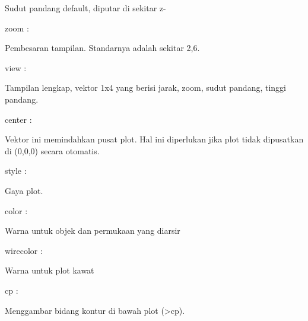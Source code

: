 \documentclass[a4paper,10pt]{article}
\begin{document}
\begin{eulernotebook}
\begin{eulercomment}
\begin{eulercomment}
\begin{eulercomment}
\begin{eulercomment}
\begin{eulercomment}
\begin{eulercomment}
\begin{eulercomment}
\begin{eulercomment}
\begin{eulerttcomment}
  Sudut pandang default, diputar di sekitar z-
\end{eulerttcomment}
\begin{eulercomment}
zoom :\\
\end{eulercomment}
\begin{eulerttcomment}
  Pembesaran tampilan. Standarnya adalah sekitar 2,6.
\end{eulerttcomment}
\begin{eulercomment}
view :\\
\end{eulercomment}
\begin{eulerttcomment}
  Tampilan lengkap, vektor 1x4 yang berisi jarak, zoom, sudut pandang,
  tinggi pandang.
\end{eulerttcomment}
\begin{eulercomment}
center :\\
\end{eulercomment}
\begin{eulerttcomment}
  Vektor ini memindahkan pusat plot. Hal ini diperlukan jika plot
  tidak dipusatkan di (0,0,0) secara otomatis.
\end{eulerttcomment}
\begin{eulercomment}
style :\\
\end{eulercomment}
\begin{eulerttcomment}
  Gaya plot.
\end{eulerttcomment}
\begin{eulercomment}
color :\\
\end{eulercomment}
\begin{eulerttcomment}
  Warna untuk objek dan permukaan yang diarsir
\end{eulerttcomment}
\begin{eulercomment}
wirecolor :\\
\end{eulercomment}
\begin{eulerttcomment}
  Warna untuk plot kawat
\end{eulerttcomment}
\begin{eulercomment}
cp :\\
\end{eulercomment}
\begin{eulerttcomment}
  Menggambar bidang kontur di bawah plot (>cp).
\end{eulerttcomment}
\begin{eulercomment}

\end{eulercomment}
\end{eulercomment}
\end{eulercomment}
\end{eulercomment}
\end{eulercomment}
\end{eulercomment}
\end{eulercomment}
\end{eulercomment}
\end{eulercomment}
\end{eulernotebook}
\end{document}
